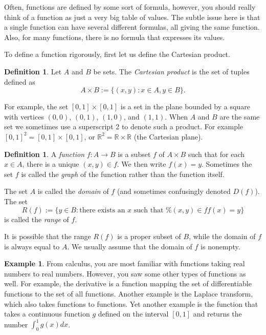 \documentclass[12pt]{book}
\newcommand{\R}{{\mathbb{R}}}
\newcommand{\myindex}[1]{#1\index{#1}}
\theoremstyle{plain}
\theoremstyle{remark}
\theoremstyle{definition}
\newtheorem{defn}[thm]{Definition}
\theoremstyle{exercise}
\theoremstyle{example}
\newtheorem{example}[thm]{Example}
\begin{document}
Often, functions are defined by some sort of
formula, however, you should really think of a function as just a very big
table of values.
The subtle issue here is that a single function can have several different
formulas, all giving the same function.  Also, for many functions, there is
no formula that expresses its values.

To define a function rigorously, first let us define the Cartesian product.

\begin{defn}
Let $A$ and $B$ be sets.  The \emph{\myindex{Cartesian product}}
is the set of tuples defined as
\begin{equation*}
A \times B :=
\{ (x,y) : x \in A, y \in B \} .
\end{equation*}
\end{defn}

For example, the set $[0,1] \times [0,1]$ is a set in the plane
bounded by a square with vertices $(0,0)$, $(0,1)$, $(1,0)$, and $(1,1)$.
When $A$ and $B$ are the same set we sometimes use a superscript 2 to denote
such a product.  For example $[0,1]^2 = 
[0,1] \times [0,1]$, or $\R^2 = \R \times \R$ (the Cartesian plane).

\begin{defn}
A \emph{function} $f \colon A \to B$ is a subset $f$ of $A \times B$
such that for each $x \in A$, there is a unique $(x,y) \in f$.  We then
write $f(x) = y$.  Sometimes
the set $f$ is called the \emph{\myindex{graph}} of the function rather than
the function itself.

The set $A$ is called the \emph{\myindex{domain}} of $f$ (and
sometimes confusingly denoted $D(f)$).  The set
\begin{equation*}
R(f) := \{ y \in B : \text{there exists an $x$ such that
$f(x)=y$
} \}
\end{equation*}
is called the \emph{\myindex{range}} of $f$.
\end{defn}

It is possible that the range $R(f)$ is a proper subset of $B$,
while the domain of $f$ is always equal to $A$.  We usually 
assume that the domain of $f$ is nonempty.

\begin{example}
From calculus, you are most familiar with functions taking real numbers to real
numbers.  However, you saw some other types of functions as well.  For
example, the derivative is a function mapping the set of
differentiable functions to the set of all functions.
Another example is the Laplace transform, which also
takes functions to functions.  Yet another example is the function that takes
a continuous function $g$ defined on the interval $[0,1]$ and returns the
number $\int_0^1 g(x) dx$.
\end{example}
\end{document}
